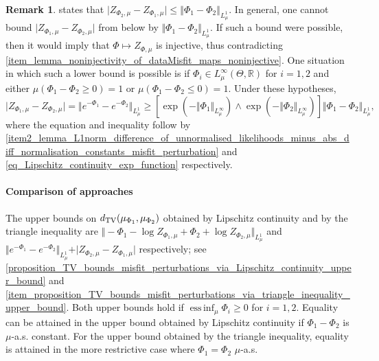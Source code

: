 \documentclass[a4paper]{scrartcl}
\theoremstyle{definition}
\newtheorem{remark}[theorem]{Remark}
\numberwithin{equation}{section}
\newcommand{\R}{\mathbb{R}}
\DeclareMathOperator*{\essinf}{ess\,inf}
\newcommand{\abs}[1]{\vert #1\vert}
\newcommand{\norm}[1]{\Vert #1 \Vert}
\newcommand{\Norm}[1]{\left\Vert #1 \right\Vert}
\newcommand{\TV}[0]{\textup{TV}}
\begin{document}
\begin{remark}
\label{remark_L1_norm_unnormalised_likelihoods_and_absolute_difference_normalisation_constants}
 states that $\abs{Z_{\Phi_2,\mu}-Z_{\Phi_1,\mu}}\leq \Norm{\Phi_1-\Phi_2}_{L^1_\mu}$.
In general, one cannot bound $\abs{Z_{\Phi_1,\mu}-Z_{\Phi_2,\mu}}$ from below by $\norm{\Phi_1-\Phi_2}_{L^1_\mu}$.
If such a bound were possible, then it would imply that $\Phi\mapsto Z_{\Phi,\mu}$ is injective, thus contradicting \ref{item_lemma_noninjectivity_of_dataMisfit_maps_noninjective}.
One situation in which such a lower bound is possible is if $\Phi_i\in L^\infty_\mu(\Theta,\R)$ for $i=1,2$ and either $\mu(\Phi_1-\Phi_2\geq 0)=1$ or $\mu(\Phi_1-\Phi_2\leq 0)=1$.
Under these hypotheses,
\begin{equation*}
 \abs{Z_{\Phi_1,\mu}-Z_{\Phi_2,\mu}}= \norm{e^{-\Phi_1}-e^{-\Phi_2}}_{L^1_\mu}\geq \left[\exp(-\norm{\Phi_1}_{L^\infty_\mu})\wedge \exp(-\norm{\Phi_2}_{L^\infty_\mu})\right]\norm{\Phi_1-\Phi_2}_{L^1_\mu},
\end{equation*}
where the equation and inequality follow by \ref{item2_lemma_L1norm_difference_of_unnormalised_likelihoods_minus_abs_diff_normalisation_constants_misfit_perturbation} and \eqref{eq_Lipschitz_continuity_exp_function} respectively.
\end{remark}

\paragraph{Comparison of approaches} 

The upper bounds on $d_{\TV}(\mu_{\Phi_1},\mu_{\Phi_2})$ obtained by Lipschitz continuity and by the triangle inequality are
 $\norm{-\Phi_1-\log Z_{\Phi_1,\mu}+\Phi_2+\log Z_{\Phi_2,\mu}}_{L^1_\mu}$ and $\norm{e^{-\Phi_1}-e^{-\Phi_2}}_{L^1_\mu}+\abs{Z_{\Phi_2,\mu}-Z_{\Phi_1,\mu}}$ respectively; see  \ref{proposition_TV_bounds_misfit_perturbations_via_Lipschitz_continuity_upper_bound}  and \ref{item_proposition_TV_bounds_misfit_perturbations_via_triangle_inequality_upper_bound}.
  Both upper bounds hold if $\essinf_\mu\Phi_i\geq 0$ for $i=1,2$.
Equality can be attained in the upper bound obtained by Lipschitz continuity if $\Phi_1-\Phi_2$ is $\mu$-a.s. constant.
For the upper bound obtained by the triangle inequality, equality is attained in the more restrictive case where $\Phi_1=\Phi_2$ $\mu$-a.s.
\end{document}

